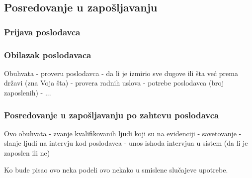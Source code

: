 \subsection{Posredovanje u zapo\v sljavanju}

\subsubsection{Prijava poslodavca}

\subsubsection{Obilazak poslodavaca}
Obuhvata
	- proveru poslodavca - da li je izmirio sve dugove ili \v sta ve\' c prema dr\v zavi (zna Voja \v sta)
	- provera radnih uslova
	- potrebe poslodavca (broj zaposlenih)
	- ...


\subsubsection{Posredovanje u zapo\v sljavanju po zahtevu poslodavca}
Ovo obuhvata 
	- zvanje kvalifikovanih ljudi koji su na evidenciji
	- savetovanje 
	- slanje ljudi na intervju kod poslodavca
	- unos ishoda intervjua u sistem (da li je zaposlen ili ne)
	
Ko bude pisao ovo neka podeli ovo nekako u smislene  slu\v cajeve upotrebe.